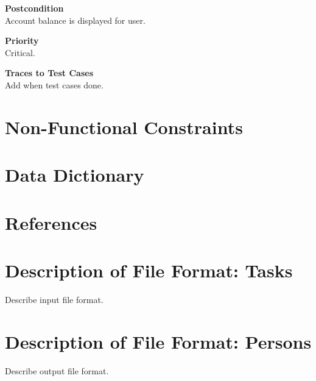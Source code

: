 \documentclass[12pt]{article}
\begin{document}
\noindent
{\bf Postcondition}\\
Account balance is displayed for user.

\noindent
{\bf Priority}\\
Critical.

\noindent
{\bf Traces to Test Cases}\\
Add when test cases done.

\section{Non-Functional Constraints}

\section{Data Dictionary}

\section{References}

\appendix

\section{Description of File Format: Tasks}

Describe input file format.

\section{Description of File Format: Persons}

Describe output file format.
\end{document}
